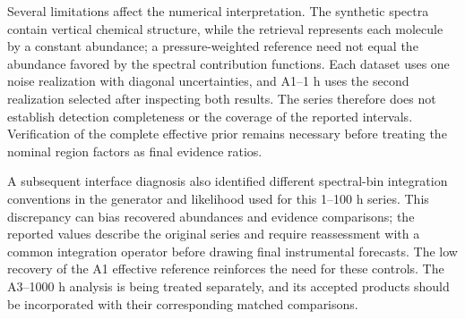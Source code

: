 Several limitations affect the numerical interpretation. The synthetic spectra contain vertical chemical structure, while the retrieval represents each molecule by a constant abundance; a pressure-weighted reference need not equal the abundance favored by the spectral contribution functions. Each dataset uses one noise realization with diagonal uncertainties, and A1--1 h uses the second realization selected after inspecting both results. The series therefore does not establish detection completeness or the coverage of the reported intervals. Verification of the complete effective prior remains necessary before treating the nominal region factors as final evidence ratios.

A subsequent interface diagnosis also identified different spectral-bin integration conventions in the generator and likelihood used for this 1--100 h series. This discrepancy can bias recovered abundances and evidence comparisons; the reported values describe the original series and require reassessment with a common integration operator before drawing final instrumental forecasts. The low recovery of the A1 effective reference reinforces the need for these controls. The A3--1000 h analysis is being treated separately, and its accepted products should be incorporated with their corresponding matched comparisons.


